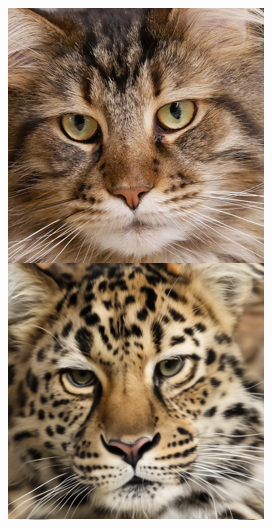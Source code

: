 \documentclass{article}
\begin{document}
\begin{figure}
    \centering
    \begin{minipage}[t]{0.48\textwidth}  %
        \centering
        \begin{minipage}[t]{0.19\textwidth} 
            \includegraphics[width=\linewidth]{img/afhq_main/afhq256_fwd_6.png}

\end{minipage}
\end{minipage}
\end{figure}
\end{document}
